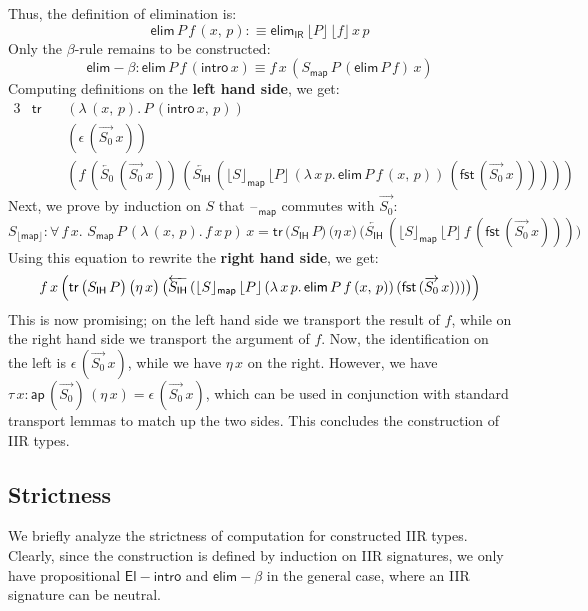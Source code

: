 \documentclass[acmsmall,screen,review,anonymous]{acmart}
\newcommand{\msf}[1]{{\mathsf{#1}}}
\newcommand{\blank}{{\mathord{\hspace{1pt}\text{--}\hspace{1pt}}}}
\newcommand{\IR}{\msf{IR}}
\newcommand{\intro}{\msf{intro}}
\newcommand{\IH}{\msf{IH}}
\newcommand{\map}{\msf{map}}
\newcommand{\elim}{\msf{elim}}
\newcommand{\tr}{\msf{tr}}
\newcommand{\fst}{\msf{fst}}
\newcommand{\floord}[1]{\lfloor #1 \rfloor}
\newcommand{\ora}[1]{\overrightarrow{#1}}
\newcommand{\ola}[1]{\overleftarrow{#1}}
\newcommand{\ap}{\msf{ap}}
\begin{document}
Thus, the definition of elimination is:
\[ \elim\,P\,f\,(x,\,p) :\equiv \elim_\IR\,\floord{P}\,\floord{f}\,x\,p \]
Only the $\beta$-rule remains to be constructed:
\[ \elim\!-\!\!\beta : \elim\,P\,f\,(\intro\,x) \equiv f\,x\,(S_\map\,P\,(\elim\,P\,f)\,x) \]
Computing definitions on the \textbf{left hand side}, we get:
\begin{alignat*}{3}
  & \tr\, &&(\lambda\,(x,\,p).\,P\,(\intro\,x,\,p))\\
  &       &&(\epsilon\,(\ora{S_0}\,x))\\
  &       &&(f\,(\ola{S_0}\,(\ora{S_0}\,x))\,(\ola{S_\IH}\,(\floord{S}_\map\,\floord{P}\,(\lambda\,x\,p.\,\elim\,P\,f\,(x,\,p))\,(\fst\,(\ora{S_0}\,x)))))
\end{alignat*}
Next, we prove by induction on $S$ that $\blank_\map$ commutes with $\ora{S_0}$:
\[ S_{\floord{\map}} : \forall\,f\,x.\,\,S_\map\,P\,(\lambda\,(x,\,p).\,f\,x\,p)\,x = \tr\,\bigl(S_\IH\,P\bigr)\,\bigl(\eta\,x\bigr)\,\bigl(\ola{S_\IH}\,(\floord{S}_\map\,\floord{P}\,f\,(\fst\,(\ora{S_0}\,x)))\bigr)\]
Using this equation to rewrite the \textbf{right hand side}, we get:
\begin{alignat*}{3}
  f\,x\,\Bigl(\tr\,\bigl(S_\IH\,P\bigr)\,\bigl(\eta\,x\bigr)\,\bigl(\ola{S_\IH}\,(\floord{S}_\map\,\floord{P}\,(\lambda\,x\,p.\,\elim\,P\,f\,(x,\,p))\,(\fst\,(\ora{S_0}\,x)))\bigr)\Bigr)
\end{alignat*}
This is now promising; on the left hand side we transport the result of $f$, while on the right hand
side we transport the argument of $f$. Now, the identification on the left is
$\epsilon\,(\ora{S_0}\,x)$, while we have $\eta\,x$ on the right. However, we have $\tau\,x :
\ap\,(\ora{S_0})\,(\eta\,x) = \epsilon\,(\ora{S_0}\,x)$, which can be used in conjunction with
standard transport lemmas to match up the two sides. This concludes the construction of IIR types.

\subsection{Strictness}
We briefly analyze the strictness of computation for constructed IIR types. Clearly, since the
construction is defined by induction on IIR signatures, we only have propositional
$\msf{El\!\!-\!\!intro}$ and $\elim\!-\!\!\beta$ in the general case, where an IIR signature can be
neutral.
\end{document}
